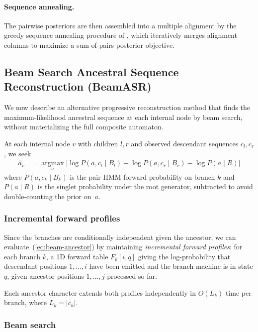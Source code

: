 \paragraph{Sequence annealing.}
The pairwise posteriors are then assembled into a multiple alignment
by the greedy sequence annealing procedure of \cite{BradleyEtAl2009},
which iteratively merges alignment columns to maximize a sum-of-pairs
posterior objective.

\subsection{Beam Search Ancestral Sequence Reconstruction (BeamASR)}
\label{sec:beam-ancestor}

We now describe an alternative progressive reconstruction method
that finds the maximum-likelihood ancestral sequence at each internal node
by beam search, without materializing the full composite automaton.

At each internal node $v$ with children $l,r$ and observed descendant sequences
$c_l, c_r$, we seek
\begin{align}
\hat{a}_v &= \operatorname*{argmax}_{a} \bigl[ \log P(a, c_l \mid B_l) + \log P(a, c_r \mid B_r) - \log P(a \mid R) \bigr]
\label{eq:beam-ancestor}
\end{align}
where $P(a, c_k \mid B_k)$ is the pair HMM forward probability on branch $k$
and $P(a \mid R)$ is the singlet probability under the root generator,
subtracted to avoid double-counting the prior on~$a$.

\subsubsection{Incremental forward profiles}

Since the branches are conditionally independent given the ancestor,
we can evaluate~(\ref{eq:beam-ancestor}) by maintaining
\emph{incremental forward profiles}: for each branch $k$, a 1D forward table
$F_k[i, q]$ giving the log-probability that descendant positions $1,\ldots,i$
have been emitted and the branch machine is in state $q$,
given ancestor positions $1,\ldots,j$ processed so far.

Each ancestor character extends both profiles independently in $O(L_k)$ time
per branch, where $L_k = |c_k|$.

\subsubsection{Beam search}

